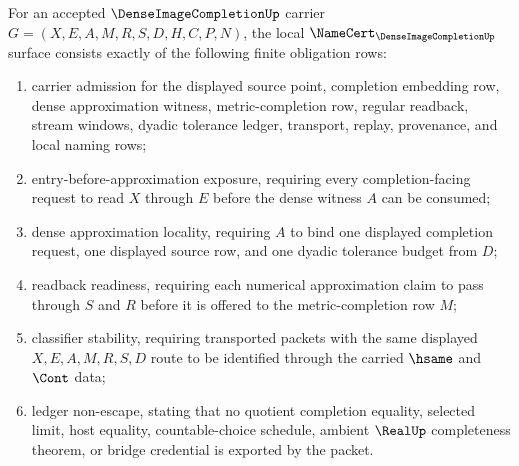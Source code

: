 \begin{theorem}
\label{thm:dense-image-completion-namecert-obligations}
For an accepted $\DenseImageCompletionUp$ carrier $G=(X,E,A,M,R,S,D,H,C,P,N)$, the local $\NameCert_{\DenseImageCompletionUp}$ surface consists exactly of the following finite obligation rows:
\begin{enumerate}
\item carrier admission for the displayed source point, completion embedding row, dense approximation witness, metric-completion row, regular readback, stream windows, dyadic tolerance ledger, transport, replay, provenance, and local naming rows;
\item entry-before-approximation exposure, requiring every completion-facing request to read $X$ through $E$ before the dense witness $A$ can be consumed;
\item dense approximation locality, requiring $A$ to bind one displayed completion request, one displayed source row, and one dyadic tolerance budget from $D$;
\item readback readiness, requiring each numerical approximation claim to pass through $S$ and $R$ before it is offered to the metric-completion row $M$;
\item classifier stability, requiring transported packets with the same displayed $X,E,A,M,R,S,D$ route to be identified through the carried $\hsame$ and $\Cont$ data;
\item ledger non-escape, stating that no quotient completion equality, selected limit, host equality, countable-choice schedule, ambient $\RealUp$ completeness theorem, or bridge credential is exported by the packet.
\end{enumerate}
\end{theorem}
